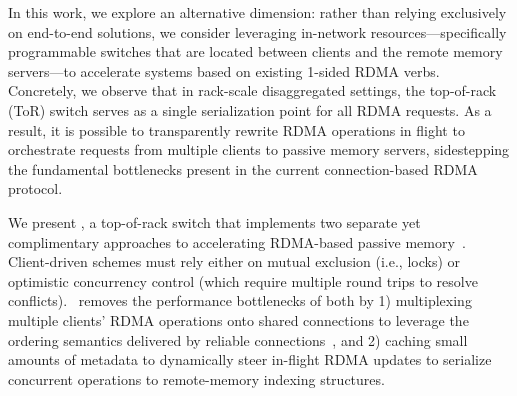 
In this work, we explore an alternative dimension: rather than relying
exclusively on end-to-end solutions, we consider leveraging in-network
resources---specifically programmable switches that are located between
clients and the remote memory servers---to accelerate systems based on
existing 1-sided RDMA verbs.  Concretely, we observe that in
rack-scale disaggregated settings, the top-of-rack (ToR) switch serves as a
single serialization point for all RDMA requests.  As a result, it is
possible to transparently rewrite RDMA operations in flight to
orchestrate requests from multiple clients to passive memory servers,
sidestepping the fundamental bottlenecks present in the current
connection-based RDMA protocol.



We present \sword, a top-of-rack switch that implements two separate
yet complimentary approaches to accelerating RDMA-based passive
memory~\cite{Grant2021InContRes}.  Client-driven schemes must rely
either on mutual exclusion (i.e., locks) or optimistic concurrency
control (which require multiple round trips to resolve conflicts).
\sword\ removes the performance bottlenecks of both by 1) multiplexing
multiple clients' RDMA operations onto shared connections to leverage
the ordering semantics delivered by reliable connections~\cite{flock},
and 2) caching small amounts of metadata to dynamically steer
in-flight RDMA updates to serialize concurrent operations to
remote-memory indexing structures.

